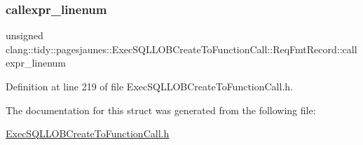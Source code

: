 \subsubsection{\texorpdfstring{callexpr\+\_\+linenum}{callexpr\_linenum}}
{\footnotesize\ttfamily unsigned clang\+::tidy\+::pagesjaunes\+::\+Exec\+S\+Q\+L\+L\+O\+B\+Create\+To\+Function\+Call\+::\+Req\+Fmt\+Record\+::callexpr\+\_\+linenum}



Definition at line 219 of file Exec\+S\+Q\+L\+L\+O\+B\+Create\+To\+Function\+Call.\+h.



The documentation for this struct was generated from the following file\+:\begin{DoxyCompactItemize}
\item 
\hyperlink{_exec_s_q_l_l_o_b_create_to_function_call_8h}{Exec\+S\+Q\+L\+L\+O\+B\+Create\+To\+Function\+Call.\+h}\end{DoxyCompactItemize}
